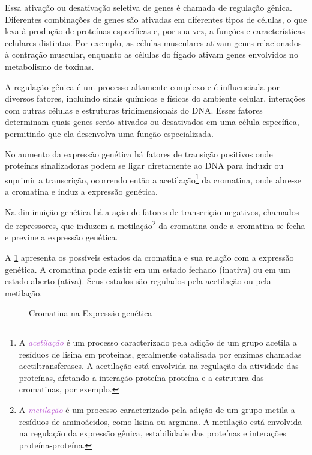 \documentclass[11pt,a4paper]{article}
\newcounter{exemplo}
\begin{document}
		Essa ativação ou desativação seletiva de genes é chamada de regulação gênica. Diferentes combinações de genes são ativadas em diferentes tipos de células, o que leva à produção de proteínas específicas e, por sua vez, a funções e características celulares distintas. Por exemplo, as células musculares ativam genes relacionados à contração muscular, enquanto as células do fígado ativam genes envolvidos no metabolismo de toxinas.

		A regulação gênica é um processo altamente complexo e é influenciada por diversos fatores, incluindo sinais químicos e físicos do ambiente celular, interações com outras células e estruturas tridimensionais do DNA. Esses fatores determinam quais genes serão ativados ou desativados em uma célula específica, permitindo que ela desenvolva uma função especializada.

		No aumento da expressão genética há fatores de transição positivos onde proteínas sinalizadoras podem se ligar diretamente ao DNA para induzir ou suprimir a transcrição, ocorrendo então a acetilação\footnote{A \textcolor{MediumOrchid}{\textit{acetilação}} é um processo caracterizado pela adição de um grupo acetila a resíduos de lisina em proteínas, geralmente catalisada por enzimas chamadas acetiltransferases. A acetilação está envolvida na regulação da atividade das proteínas, afetando a interação proteína-proteína e a estrutura das cromatinas, por exemplo.} da cromatina, onde abre-se a cromatina e induz a expressão genética.

		Na diminuição genética há a ação de fatores de transcrição negativos, chamados de repressores, que induzem a metilação\footnote{A \textcolor{MediumOrchid}{\textit{metilação}} é um processo caracterizado pela adição de um grupo metila a resíduos de aminoácidos, como lisina ou arginina. A metilação está envolvida na regulação da expressão gênica, estabilidade das proteínas e interações proteína-proteína.} da cromatina onde a cromatina se fecha e previne a expressão genética. 

		A \ref{fig:cromatinaExpressaoGenetiva} apresenta os possíveis estados da cromatina e sua relação com a expressão genética. A cromatina pode existir em um estado fechado (inativa) ou em um estado aberto (ativa). Seus estados são regulados pela acetilação ou pela metilação.


		\begin{figure}[h]
			\centering
			\caption{Cromatina na Expressão genética}
			\label{fig:cromatinaExpressaoGenetiva}
		\end{figure}
\end{document}
